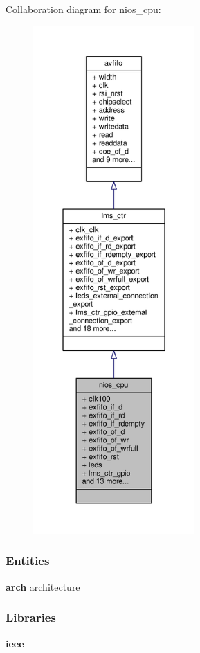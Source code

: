 Collaboration diagram for nios\+\_\+cpu\+:\nopagebreak
\begin{figure}[H]
\begin{center}
\leavevmode
\includegraphics[height=550pt]{d9/d21/classnios__cpu__coll__graph}
\end{center}
\end{figure}
\subsubsection*{Entities}
\begin{DoxyCompactItemize}
\item 
{\bf arch} architecture
\end{DoxyCompactItemize}
\subsubsection*{Libraries}
 \begin{DoxyCompactItemize}
\item 
{\bf ieee} 
\end{DoxyCompactItemize}
